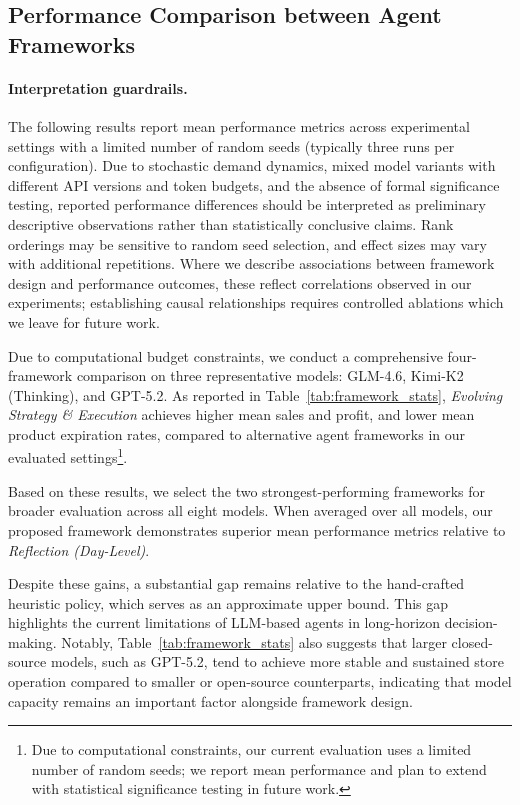 \subsection{Performance Comparison between Agent Frameworks}

\paragraph{Interpretation guardrails.}
The following results report mean performance metrics across experimental settings with a limited number of random seeds (typically three runs per configuration). Due to stochastic demand dynamics, mixed model variants with different API versions and token budgets, and the absence of formal significance testing, reported performance differences should be interpreted as preliminary descriptive observations rather than statistically conclusive claims. Rank orderings may be sensitive to random seed selection, and effect sizes may vary with additional repetitions. Where we describe associations between framework design and performance outcomes, these reflect correlations observed in our experiments; establishing causal relationships requires controlled ablations which we leave for future work.

Due to computational budget constraints, we conduct a comprehensive four-framework comparison on three representative models: GLM-4.6, Kimi-K2 (Thinking), and GPT-5.2. As reported in Table~\ref{tab:framework_stats}, \textit{Evolving Strategy \& Execution} achieves higher mean sales and profit, and lower mean product expiration rates, compared to alternative agent frameworks in our evaluated settings\footnote{Due to computational constraints, our current evaluation uses a limited number of random seeds; we report mean performance and plan to extend with statistical significance testing in future work.}.

Based on these results, we select the two strongest-performing frameworks for broader evaluation across all eight models. When averaged over all models, our proposed framework demonstrates superior mean performance metrics relative to \textit{Reflection (Day-Level)}.

Despite these gains, a substantial gap remains relative to the hand-crafted heuristic policy, which serves as an approximate upper bound. This gap highlights the current limitations of LLM-based agents in long-horizon decision-making. Notably, Table~\ref{tab:framework_stats} also suggests that larger closed-source models, such as GPT-5.2, tend to achieve more stable and sustained store operation compared to smaller or open-source counterparts, indicating that model capacity remains an important factor alongside framework design.

